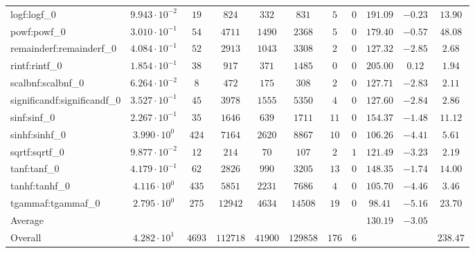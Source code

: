 \begin{tabular}{|l|c|c|c|c|c|c|c|c|c|c|}
logf:logf\_0                 & $ 9.943 \cdot 10^{-2} $ & $ 19     $ & $ 824    $ & $ 332   $ & $ 831    $ & $ 5   $ & $ 0 $ & $ 191.09      $ & $ -0.23   $ & $ 13.90   $ \\
powf:powf\_0                 & $ 3.010 \cdot 10^{-1} $ & $ 54     $ & $ 4711   $ & $ 1490  $ & $ 2368   $ & $ 5   $ & $ 0 $ & $ 179.40      $ & $ -0.57   $ & $ 48.08   $ \\
remainderf:remainderf\_0     & $ 4.084 \cdot 10^{-1} $ & $ 52     $ & $ 2913   $ & $ 1043  $ & $ 3308   $ & $ 2   $ & $ 0 $ & $ 127.32      $ & $ -2.85   $ & $ 2.68    $ \\
rintf:rintf\_0               & $ 1.854 \cdot 10^{-1} $ & $ 38     $ & $ 917    $ & $ 371   $ & $ 1485   $ & $ 0   $ & $ 0 $ & $ 205.00      $ & $ 0.12    $ & $ 1.94    $ \\
scalbnf:scalbnf\_0           & $ 6.264 \cdot 10^{-2} $ & $ 8      $ & $ 472    $ & $ 175   $ & $ 308    $ & $ 2   $ & $ 0 $ & $ 127.71      $ & $ -2.83   $ & $ 2.11    $ \\
significandf:significandf\_0 & $ 3.527 \cdot 10^{-1} $ & $ 45     $ & $ 3978   $ & $ 1555  $ & $ 5350   $ & $ 4   $ & $ 0 $ & $ 127.60      $ & $ -2.84   $ & $ 2.86    $ \\
sinf:sinf\_0                 & $ 2.267 \cdot 10^{-1} $ & $ 35     $ & $ 1646   $ & $ 639   $ & $ 1711   $ & $ 11  $ & $ 0 $ & $ 154.37      $ & $ -1.48   $ & $ 11.12   $ \\
sinhf:sinhf\_0               & $ 3.990 \cdot 10^{0}  $ & $ 424    $ & $ 7164   $ & $ 2620  $ & $ 8867   $ & $ 10  $ & $ 0 $ & $ 106.26      $ & $ -4.41   $ & $ 5.61    $ \\
sqrtf:sqrtf\_0               & $ 9.877 \cdot 10^{-2} $ & $ 12     $ & $ 214    $ & $ 70    $ & $ 107    $ & $ 2   $ & $ 1 $ & $ 121.49      $ & $ -3.23   $ & $ 2.19    $ \\
tanf:tanf\_0                 & $ 4.179 \cdot 10^{-1} $ & $ 62     $ & $ 2826   $ & $ 990   $ & $ 3205   $ & $ 13  $ & $ 0 $ & $ 148.35      $ & $ -1.74   $ & $ 14.00   $ \\
tanhf:tanhf\_0               & $ 4.116 \cdot 10^{0}  $ & $ 435    $ & $ 5851   $ & $ 2231  $ & $ 7686   $ & $ 4   $ & $ 0 $ & $ 105.70      $ & $ -4.46   $ & $ 3.46    $ \\
tgammaf:tgammaf\_0           & $ 2.795 \cdot 10^{0}  $ & $ 275    $ & $ 12942  $ & $ 4634  $ & $ 14508  $ & $ 19  $ & $ 0 $ & $ 98.41       $ & $ -5.16   $ & $ 23.70   $ \\
\hline
Average                      & $                     $ & $        $ & $        $ & $       $ & $        $ & $     $ & $   $ & $ 130.19      $ & $ -3.05   $ & $         $ \\
\hline
Overall                      & $ 4.282 \cdot 10^{1}  $ & $ 4693   $ & $ 112718 $ & $ 41900 $ & $ 129858 $ & $ 176 $ & $ 6 $ & $             $ & $         $ & $ 238.47  $ \\
\hline
\end{tabular}
